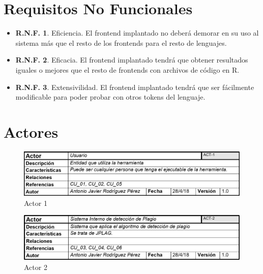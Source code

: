 \section{Requisitos No Funcionales}
\begin{itemize}
\item \textbf{R.N.F. 1}. Eficiencia.
El frontend implantado no deberá demorar en su uso al sistema más que el resto de los frontends para el resto de lenguajes.
\item \textbf{R.N.F. 2}. Eficacia.
El frontend implantado tendrá que obtener resultados iguales o mejores que el resto de frontends con archivos de código en R.
\item \textbf{R.N.F. 3}. Extensivilidad.
El frontend implantado tendrá que ser fácilmente modificable para poder probar con otros tokens del lenguaje.
\end{itemize}

\section{Actores}

\begin{figure}[H] %
\centering
\includegraphics[scale=0.4]{imagenes/ACT_1.png}  %
\caption{Actor 1} \label{fig:figura2}
\end{figure}

\begin{figure}[H] %
\centering
\includegraphics[scale=0.4]{imagenes/ACT_2.png}  %
\caption{Actor 2} \label{fig:figura3}
\end{figure}



